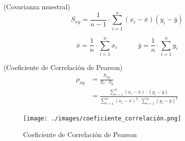 \documentclass[../main.tex]{subfiles}
\begin{document}
        \begin{definition} (Covarianza muestral) 
            \begin{equation}
                S_{xy} = \frac{1}{n-1} \cdot \sum_{i=1}^{n}(x_i - \bar{x})(y_i - \bar{y})
            \end{equation}
        \end{definition}
        
        \begin{equation}
            \bar{x} = \frac{1}{n} \cdot \sum_{i=1}^{n} x_i \quad  \quad \quad \bar{y} = \frac{1}{n} \cdot \sum_{i=1}^{n} y_i
        \end{equation}

        \begin{definition} (Coeficiente de Correlación de Pearson)
            \begin{equation}
                \begin{split}
                    \rho_{xy} &= \frac{S_{xy}}{S_x \cdot S_y}
                    \\&= \frac{\sum_{i=1}^{n} (x_i - \bar{x}) \cdot (y_i - \bar{y})}{\sum_{i=1}^{n} (x_i - \bar{x})^2 \cdot \sum_{i=1}^{n} (y_i - \bar{y})^2}
                \end{split}
            \end{equation}

            \begin{figure}[htb]
                \centering
                \texttt{[image: ./images/coeficiente\_correlación.png]}
                \caption{Coeficiente de Correlación de Pearson}
                \label{fig:coeficiente_correlación}
            \end{figure}
        \end{definition}
\end{document}
